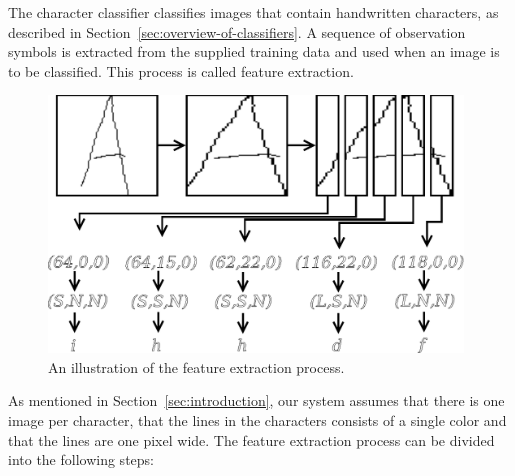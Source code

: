 
The character classifier classifies images that contain handwritten characters, as described in Section~\ref{sec:overview-of-classifiers}. 
A sequence of observation symbols is extracted from the supplied training data and used when an image is to be classified. 
This process is called feature extraction. 

    \begin{figure}[htb] 
      \begin{center}
	\leavevmode
	\includegraphics[width=110mm]{image_feature_extraction.pdf}%
      \end{center}
      \caption{An illustration of the feature extraction process.}
      \label{fig:image_feature_extraction}
    \end{figure}


As mentioned in Section~\ref{sec:introduction}, our system assumes that there is one image per character, that the lines in the characters consists of a single color and that the lines are one pixel wide. The feature extraction process can be divided into the following steps:

